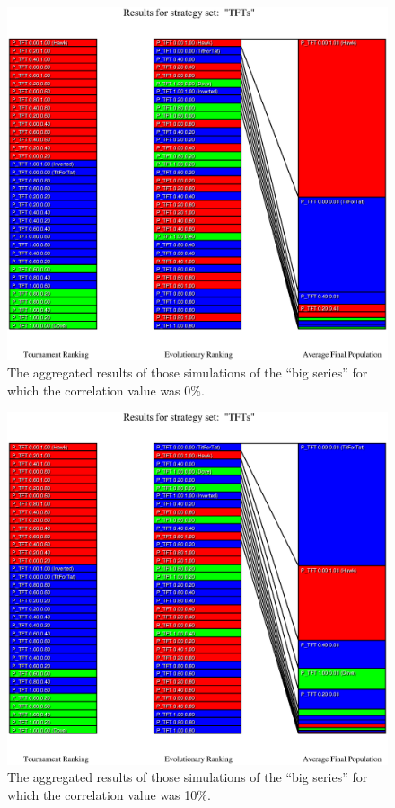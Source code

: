 \begin{figure}
\begin{center}
\includegraphics[width=20cm]{tables/TFTs_C0.000.eps}
\caption{\label{TFTs_C0000} The aggregated results of those
simulations of the ``big series'' for which the correlation value was 0\%.}
\end{center}
\end{figure}

\begin{figure}
\begin{center}
\includegraphics[width=20cm]{tables/TFTs_C0.100.eps}
\caption{\label{TFTs_C0100} The aggregated results of those
simulations of the ``big series'' for which the correlation value was 10\%.}
\end{center}
\end{figure}

